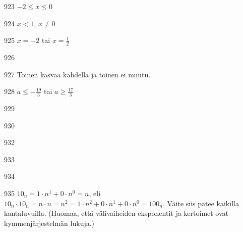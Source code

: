 \begin{Vastaus}{923}
$-2 \leq x \leq 0$
\end{Vastaus}
\begin{Vastaus}{924}
$x<1$, $x\neq0$
\end{Vastaus}
\begin{Vastaus}{925}
$x=-2$ tai $x=\frac{1}{2}$
\end{Vastaus}
\begin{Vastaus}{926}
    
\end{Vastaus}
\begin{Vastaus}{927}
     Toinen kasvaa kahdella ja toinen ei muutu.
    
\end{Vastaus}
\begin{Vastaus}{928}
$a \leq -\frac{19}{3}$ tai $a \geq \frac{17}{3}$
\end{Vastaus}
\begin{Vastaus}{929}
\end{Vastaus}
\begin{Vastaus}{930}
\end{Vastaus}
\begin{Vastaus}{932}
	
\end{Vastaus}
\begin{Vastaus}{933}
\end{Vastaus}
\begin{Vastaus}{934}
\end{Vastaus}
\begin{Vastaus}{935}
$10_n=1\cdot n^1+0\cdot n^0=n$, eli $10_n \cdot 10_n =n\cdot n = n^2= 1\cdot n^2 + 0 \cdot n^1 + 0\cdot n^0 =100_n$. Väite siis pätee kaikilla kantaluvuilla. (Huomaa, että välivaiheiden eksponentit ja kertoimet ovat kymmenjärjestelmän lukuja.)
	
\end{Vastaus}

